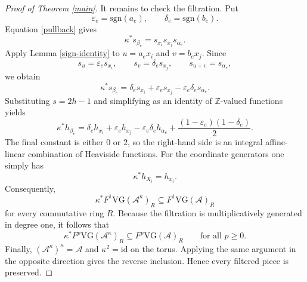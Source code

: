 \documentclass[10pt,a4paper]{amsart}
\numberwithin{equation}{section}
\numberwithin{equation}{section}
\newcommand{\Z}{\mathbb{Z}}
\newcommand{\A}{\mathcal{A}}
\newcommand{\VG}{\mathrm{VG}}
\newcommand{\sgn}{\mathrm{sgn}}
\begin{document}
\begin{proof}[Proof of Theorem \ref{main}]
It remains to check the filtration.  Put
\[
\varepsilon_e=\sgn(a_e),\qquad \delta_e=\sgn(b_e).
\]
Equation \eqref{pullback} gives
\[
\kappa^*s_{\beta_e}=s_{x_i}s_{x_j}s_{\alpha_e}.
\]
Apply Lemma \ref{sign-identity} to $u=a_ex_i$ and $v=b_ex_j$.  Since
\[
s_u=\varepsilon_es_{x_i},\qquad
s_v=\delta_es_{x_j},\qquad
s_{u+v}=s_{\alpha_e},
\]
we obtain
\begin{equation}\label{sign-pullback}
\kappa^*s_{\beta_e}
=\delta_es_{x_i}+\varepsilon_es_{x_j}
-\varepsilon_e\delta_es_{\alpha_e}.
\end{equation}
Substituting $s=2h-1$ and simplifying as an identity of $\Z$-valued functions yields
\begin{equation}\label{heaviside-pullback}
\kappa^*h_{\beta_e}
=\delta_eh_{x_i}+\varepsilon_eh_{x_j}
-\varepsilon_e\delta_eh_{\alpha_e}
+\frac{(1-\varepsilon_e)(1-\delta_e)}{2}.
\end{equation}
The final constant is either $0$ or $2$, so the right-hand side is an integral affine-linear combination of Heaviside functions.  For the coordinate generators one simply has
\[
\kappa^*h_{X_i}=h_{x_i}.
\]
Consequently,
\[
\kappa^*F^1\VG(\A^\kappa)_R\subseteq F^1\VG(\A)_R
\]
for every commutative ring $R$.  Because the filtration is multiplicatively generated in degree one, it follows that
\[
\kappa^*F^p\VG(\A^\kappa)_R\subseteq F^p\VG(\A)_R
\qquad\text{for all }p\geq0.
\]
Finally, $(\A^\kappa)^\kappa=\A$ and $\kappa^2=\mathrm{id}$ on the torus.  Applying the same argument in the opposite direction gives the reverse inclusion.  Hence every filtered piece is preserved.
\end{proof}
\end{document}
